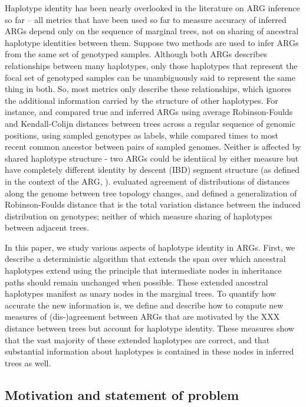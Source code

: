 \documentclass[10pt,twoside,lineno]{gsajnl}
\begin{document}
Haplotype identity has been nearly overlooked in the literature on ARG inference so far --
all metrics that have been used so far to measure accuracy of inferred ARGs
depend only on the sequence of marginal trees,
not on sharing of ancestral haplotype identities between them.
Suppose two methods are used to infer ARGs from the same set of genotyped samples.
Although both ARGs describes relationships between many haplotypes,
only those haplotypes that represent the focal set of genotyped samples
can be unambiguously said to represent the same thing in both.
So, most metrics only describe these relationships,
which ignores the additional information carried by the structure of other haplotypes.
For instance, \citet{kelleher2019inferring} and \citet{zhang2023biobankscale}
compared true and inferred ARGs
using average Robinson-Foulds and Kendall-Colijn distances between trees
across a regular sequence of genomic positions,
using sampled genotypes as labels,
while \citet{brandt2022evaluation} compared times to most recent common ancestor
between pairs of sampled genomes.
Neither is affected by shared haplotype structure -
two ARGs could be identiical by either measure
but have completely different identity by descent (IBD) segment structure
(as defined in the context of the ARG, \citep{XXX}).
\citet{deng2021distribution} evaluated agreement of distributions of
distances along the genome between tree topology changes,
and \citet{zhang2023biobankscale} defined a generalization of Robinson-Foulds distance
that is the total variation distance between the induced distribution on genotypes;
neither of which measure sharing of haplotypes between adjacent trees.

In this paper, we study various aspects of haplotype identity in ARGs.
First, we describe a deterministic algorithm that
extends the span over which ancestral haplotypes extend
using the principle that intermediate nodes in inheritance paths
should remain unchanged when possible.
These extended ancestral haplotypes manifest as unary nodes in the marginal trees.
To quantify how accurate the new information is,
we define and describe how to compute new measures of (dis-)agreement between ARGs
that are motivated by the XXX distance between trees
but account for haplotype identity.
These measures show that the vast majority of these extended haplotypes are correct,
and that substantial information about haplotypes is contained in these nodes
in inferred trees as well.


\subsection{Motivation and statement of problem}
\end{document}
